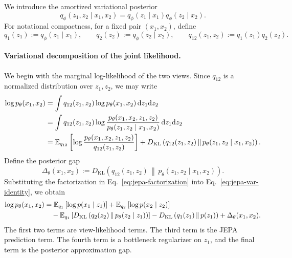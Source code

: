 \documentclass{article}
\newcommand{\E}{\mathbb{E}}
\newcommand{\KL}{D_{\mathrm{KL}}}
\begin{document}
We introduce the amortized variational posterior
\begin{equation}
q_\phi(z_1,z_2\mid x_1,x_2)
=
q_\phi(z_1\mid x_1)q_\phi(z_2\mid x_2).
\label{eq:jepa-variational-posterior}
\end{equation}
For notational compactness, for a fixed pair $(x_1,x_2)$, define
\[
q_1(z_1) := q_\phi(z_1\mid x_1),
\qquad
q_2(z_2) := q_\phi(z_2\mid x_2),
\qquad
q_{12}(z_1,z_2) := q_1(z_1)q_2(z_2).
\]

\paragraph{Variational decomposition of the joint likelihood.}
We begin with the marginal log-likelihood of the two views. Since $q_{12}$ is a normalized distribution over $z_1,z_2$, we may write
\begin{align}
\log p_\theta(x_1,x_2)
&=
\int q_{12}(z_1,z_2)
\log p_\theta(x_1,x_2)
\,\mathrm{d}z_1\mathrm{d}z_2
\notag \\
&=
\int q_{12}(z_1,z_2)
\log
\frac{
p_\theta(x_1,x_2,z_1,z_2)
}{
p_\theta(z_1,z_2\mid x_1,x_2)
}
\,\mathrm{d}z_1\mathrm{d}z_2
\notag \\
&=
\E_{q_{12}}
\left[
\log
\frac{
p_\theta(x_1,x_2,z_1,z_2)
}{
q_{12}(z_1,z_2)
}
\right]
+
\KL
\left(
q_{12}(z_1,z_2)
\,\middle\|\,
p_\theta(z_1,z_2\mid x_1,x_2)
\right).
\label{eq:jepa-var-identity}
\end{align}
Define the posterior gap
\begin{equation}
\Delta_\theta(x_1,x_2)
:=
\KL
\left(
q_{12}(z_1,z_2)
\,\middle\|\,
p_\theta(z_1,z_2\mid x_1,x_2)
\right).
\label{eq:jepa-posterior-gap}
\end{equation}
Substituting the factorization in Eq.~\eqref{eq:jepa-factorization} into Eq.~\eqref{eq:jepa-var-identity}, we obtain
\begin{align}
\log p_\theta(x_1,x_2)
&=
\E_{q_1}
\left[
\log p(x_1\mid z_1)
\right]
+
\E_{q_2}
\left[
\log p(x_2\mid z_2)
\right]
\notag \\
&\quad
-
\E_{q_1}
\left[
\KL
\left(
q_2(z_2)
\,\middle\|\,
p_\theta(z_2\mid z_1)
\right)
\right]
-
\KL
\left(
q_1(z_1)
\,\middle\|\,
p(z_1)
\right)
+
\Delta_\theta(x_1,x_2).
\label{eq:jepa-elbo-decomposition}
\end{align}
The first two terms are view-likelihood terms. The third term is the JEPA prediction term. The fourth term is a bottleneck regularizer on $z_1$, and the final term is the posterior approximation gap.
\end{document}
